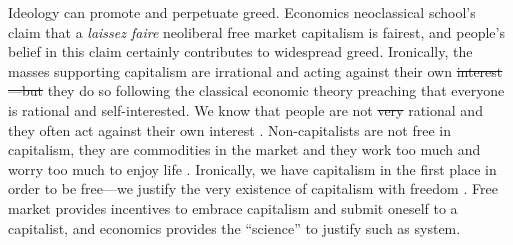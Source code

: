 \documentclass[10pt, letterpaper]{article}
\providecommand{\DIFaddtex}[1]{{\protect\color{blue}\uwave{#1}}} %
\providecommand{\DIFdeltex}[1]{{\protect\color{red}\sout{#1}}}                      %
\providecommand{\DIFaddbegin}{} %
\providecommand{\DIFaddend}{} %
\providecommand{\DIFdelbegin}{} %
\providecommand{\DIFdelend}{} %
\providecommand{\DIFadd}[1]{\texorpdfstring{\DIFaddtex{#1}}{#1}} %
\providecommand{\DIFdel}[1]{\texorpdfstring{\DIFdeltex{#1}}{}} %
\newcommand{\DIFscaledelfig}{0.5}
\newlength{\DIFdelgraphicswidth} %
\newlength{\DIFdelgraphicsheight} %
\newcommand{\DIFaddincludegraphics}[2][]{{\color{blue}\fbox{\DIFOincludegraphics[#1]{#2}}}} %
\newcommand{\DIFdelincludegraphics}[2][]{%
\sbox{\DIFdelgraphicsbox}{\DIFOincludegraphics[#1]{#2}}%
\settoboxwidth{\DIFdelgraphicswidth}{\DIFdelgraphicsbox} %
\settoboxtotalheight{\DIFdelgraphicsheight}{\DIFdelgraphicsbox} %
\scalebox{\DIFscaledelfig}{%
\parbox[b]{\DIFdelgraphicswidth}{\usebox{\DIFdelgraphicsbox}\\[-\baselineskip] \rule{\DIFdelgraphicswidth}{0em}}\llap{\resizebox{\DIFdelgraphicswidth}{\DIFdelgraphicsheight}{%
\setlength{\unitlength}{\DIFdelgraphicswidth}%
\begin{picture}(1,1)%
\thicklines\linethickness{2pt} %
{\color[rgb]{1,0,0}\put(0,0){\framebox(1,1){}}}%
{\color[rgb]{1,0,0}\put(0,0){\line( 1,1){1}}}%
{\color[rgb]{1,0,0}\put(0,1){\line(1,-1){1}}}%
\end{picture}%
}\hspace*{3pt}}} %
} %
\DeclareRobustCommand{\DIFaddbegin}{\DIFOaddbegin \let\includegraphics\DIFaddincludegraphics} %
\DeclareRobustCommand{\DIFaddend}{\DIFOaddend \let\includegraphics\DIFOincludegraphics} %
\DeclareRobustCommand{\DIFdelbegin}{\DIFOdelbegin \let\includegraphics\DIFdelincludegraphics} %
\DeclareRobustCommand{\DIFdelend}{\DIFOaddend \let\includegraphics\DIFOincludegraphics} %
\begin{document}
\begin{spacing}{1.8}

Ideology can promote and perpetuate greed. Economics neoclassical school's claim that a \textit{laissez faire} neoliberal free market capitalism is fairest, and people's belief
in this claim certainly contributes to widespread greed. Ironically, the masses supporting capitalism are irrational and acting against
their own \DIFdelbegin \DIFdel{interest---but }\DIFdelend \DIFaddbegin \DIFadd{interest---and }\DIFaddend they do so following the classical economic theory preaching that everyone is rational and self-interested. 
We know that people are not \DIFdelbegin \DIFdel{very }\DIFdelend \DIFaddbegin \DIFadd{perfectly }\DIFaddend rational and they often act against their own
interest \citep{akerlof10,ariely09,shiller15}. Non-capitalists are not
free in capitalism, they are commodities in the market and they work too much and worry too much to enjoy life \citep{aokJap14}. Ironically, we
have capitalism in the first place in order to be free---we justify the very
existence of capitalism with freedom \citep{hayek14,friedman09,glaeser11B}. Free
market provides incentives to embrace capitalism and submit oneself to a capitalist, and economics provides the ``science'' to justify such as system.



\end{spacing}
\end{document}

